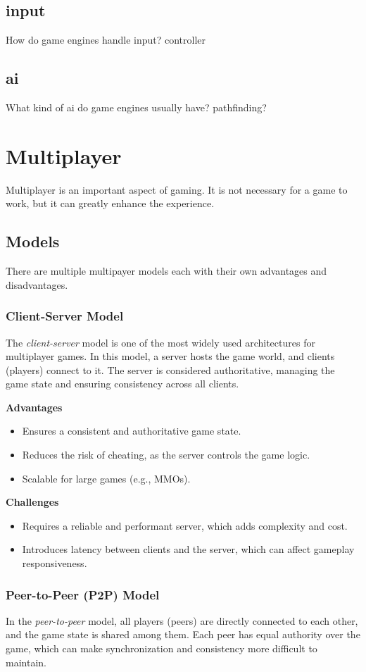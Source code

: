 \documentclass{article} %
\begin{document}
\subsection{input}
How do game engines handle input?
controller
\subsection{ai}
What kind of ai do game engines usually have?
pathfinding?
\newpage

\section{Multiplayer}
Multiplayer is an important aspect of gaming. It is not necessary for a game to work, but it can greatly enhance the experience.
\subsection{Models}
There are multiple multipayer models each with their own advantages and disadvantages. \cite{Kroupp_2024}

\subsubsection{Client-Server Model}
The \textit{client-server} model is one of the most widely used architectures for multiplayer games. In this model, a server hosts the game world, and clients (players) connect to it. The server is considered authoritative, managing the game state and ensuring consistency across all clients.

\textbf{Advantages}
\begin{itemize}
    \item Ensures a consistent and authoritative game state.
    \item Reduces the risk of cheating, as the server controls the game logic.
    \item Scalable for large games (e.g., MMOs).
\end{itemize}

\textbf{Challenges}
\begin{itemize}
    \item Requires a reliable and performant server, which adds complexity and cost.
    \item Introduces latency between clients and the server, which can affect gameplay responsiveness.
\end{itemize}

\subsubsection{Peer-to-Peer (P2P) Model}
In the \textit{peer-to-peer} model, all players (peers) are directly connected to each other, and the game state is shared among them. Each peer has equal authority over the game, which can make synchronization and consistency more difficult to maintain.
\end{document}
